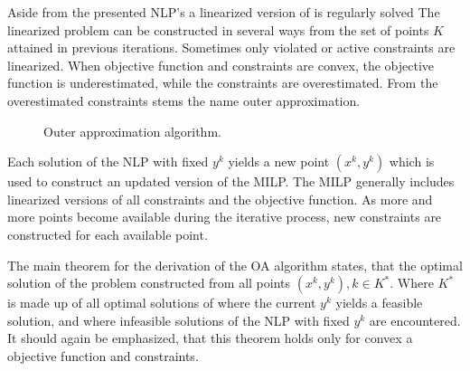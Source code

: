         Aside from the presented NLP's a linearized version of  is regularly solved
        The linearized problem can be constructed in several ways from the set of points $K$ attained in previous iterations.
        Sometimes only violated or active constraints are linearized. When objective function and constraints are convex, the
        objective function is underestimated, while the constraints are overestimated. From the overestimated constraints stems
        the name outer approximation.

        \begin{figure}
            \center
            
            \caption{Outer approximation algorithm.}
            \label{fig:OA_algorithm}
        \end{figure}

        Each solution of the NLP with fixed $y^k$ yields a new point $(x^k,y^k)$ which is used to
        construct an updated version of the MILP. The MILP generally includes linearized versions of all constraints and
        the objective function. As more and more points become available during the iterative process, new constraints
        are constructed for each available point.

        The main theorem for the derivation of the OA algorithm states, that the optimal solution of the problem
         constructed from all points $(x^k,y^k), k \in K^{\ast}$. Where $K^{\ast}$ is made up of
        all optimal solutions of  where the current $y^k$ yields a feasible solution, and
         where infeasible solutions of the NLP with fixed $y^k$ are encountered. It should
        again be emphasized, that this theorem holds only for convex a objective function and constraints.

